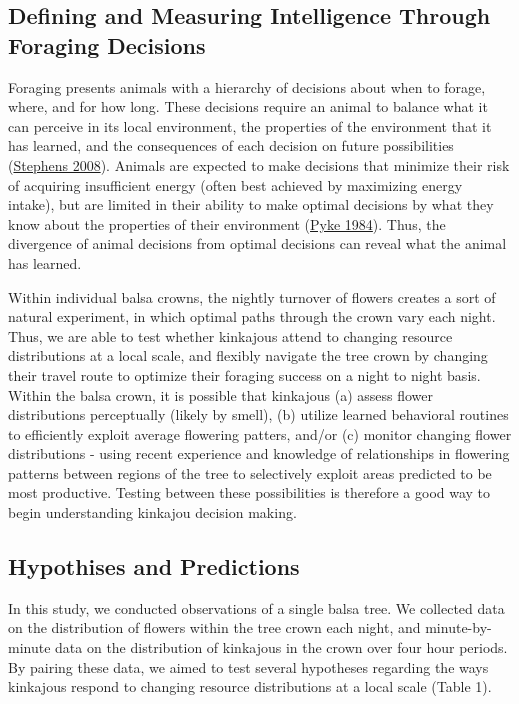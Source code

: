 \documentclass[twoside,12pt,final]{ucthesis-CA2012}
\begin{document}
\begin{ucmainmatter}
\hypertarget{defining-and-measuring-intelligence-through-foraging-decisions}{%
\subsection{Defining and Measuring Intelligence Through Foraging Decisions}\label{defining-and-measuring-intelligence-through-foraging-decisions}}

Foraging presents animals with a hierarchy of decisions about when to forage, where, and for how long. These decisions require an animal to balance what it can perceive in its local environment, the properties of the environment that it has learned, and the consequences of each decision on future possibilities (\protect\hyperlink{ref-stephens2008}{Stephens 2008}). Animals are expected to make decisions that minimize their risk of acquiring insufficient energy (often best achieved by maximizing energy intake), but are limited in their ability to make optimal decisions by what they know about the properties of their environment (\protect\hyperlink{ref-pyke1984}{Pyke 1984}). Thus, the divergence of animal decisions from optimal decisions can reveal what the animal has learned.

Within individual balsa crowns, the nightly turnover of flowers creates a sort of natural experiment, in which optimal paths through the crown vary each night. Thus, we are able to test whether kinkajous attend to changing resource distributions at a local scale, and flexibly navigate the tree crown by changing their travel route to optimize their foraging success on a night to night basis. Within the balsa crown, it is possible that kinkajous (a) assess flower distributions perceptually (likely by smell), (b) utilize learned behavioral routines to efficiently exploit average flowering patters, and/or (c) monitor changing flower distributions - using recent experience and knowledge of relationships in flowering patterns between regions of the tree to selectively exploit areas predicted to be most productive. Testing between these possibilities is therefore a good way to begin understanding kinkajou decision making.

\hypertarget{hypothises-and-predictions}{%
\subsection{Hypothises and Predictions}\label{hypothises-and-predictions}}

In this study, we conducted observations of a single balsa tree. We collected data on the distribution of flowers within the tree crown each night, and minute-by-minute data on the distribution of kinkajous in the crown over four hour periods. By pairing these data, we aimed to test several hypotheses regarding the ways kinkajous respond to changing resource distributions at a local scale (Table 1).


\end{ucmainmatter}
\end{document}
